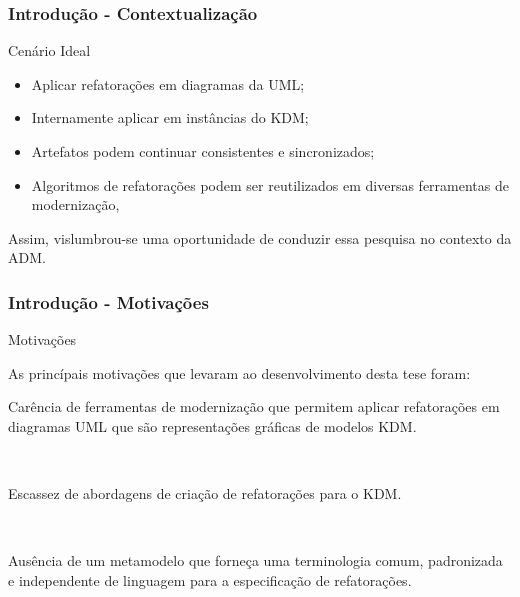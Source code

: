 \documentclass{beamer}
\begin{document}
\begin{frame}\frametitle{Introdução - Contextualização}

\begin{block}{Cenário Ideal}
\begin{minipage}[b]{10.80cm}
\begin{itemize}
  \item Aplicar refatorações em diagramas da UML;
  \item Internamente aplicar em instâncias do KDM;
  \item Artefatos podem continuar consistentes e sincronizados;
  \item Algoritmos de refatorações podem ser reutilizados em diversas ferramentas de modernização,
\end{itemize}
\end{minipage}  
\end{block}

Assim, vislumbrou-se uma oportunidade de conduzir essa pesquisa no contexto da ADM. 

\end{frame}

\begin{frame}\frametitle{Introdução - Motivações}


\begin{block}{Motivações}
\begin{minipage}[b]{10.80cm}
As princípais motivações que levaram ao desenvolvimento desta tese foram:
\end{minipage}  
\end{block}


\newline
\newline
\begin{enumerate}
	\begin{minipage}[b]{9.5cm}\item Carência de ferramentas de modernização que permitem aplicar refatorações em diagramas UML que são representações gráficas de modelos KDM.\\\end{minipage}\\
	\begin{minipage}[b]{9.5cm}\item Escassez de abordagens de criação de refatorações para o KDM.\\\end{minipage}\\		
	\begin{minipage}[b]{9.5cm}\item Ausência de um metamodelo que forneça uma terminologia comum, padronizada e independente de linguagem para a especificação de refatorações.\end{minipage}\\		
\end{enumerate}


\end{frame}
\end{document}
